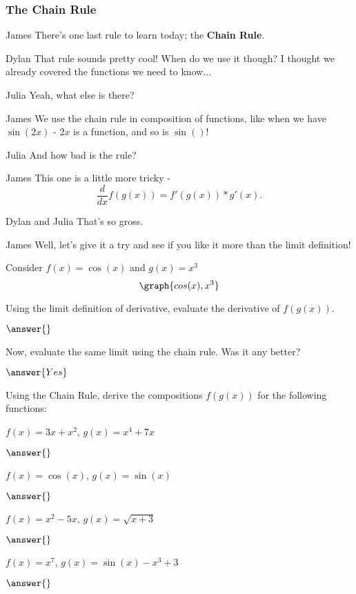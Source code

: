 \documentclass{ximera}
\begin{document}
\subsubsection{The Chain Rule}
\begin{dialogue}
\item[James] There's one last rule to learn today; the \textbf{Chain Rule}.
\item[Dylan] That rule sounds pretty cool! When do we use it though? I thought we already covered the functions we need to know...
\item[Julia] Yeah, what else is there?
\item[James] We use the chain rule in composition of functions, like when we have $\sin(2x)$ - $2x$ is a function, and so is $\sin()$!
\item[Julia] And how bad is the rule?
\item[James] This one is a little more tricky - $$\frac{d}{dx}f(g(x)) = f'(g(x))*g'(x)\text{.}$$
\item[Dylan and Julia] That's so gross.
\item[James] Well, let's give it a try and see if you like it more than the limit definition!
\end{dialogue}
\begin{question}
Consider $f(x) = \cos(x)$ and $g(x) = x^3$
\[
\graph{cos(x), x^3}
\]

Using the limit definition of derivative, evaluate the derivative of $f(g(x))$.

$\answer{}$

Now, evaluate the same limit using the chain rule. Was it any better?

$\answer{Yes}$
\end{question}
\begin{question}

Using the Chain Rule, derive the compositions $f(g(x))$ for the following functions:

$f(x) = 3x+x^2$, $g(x) = x^4+7x$

$\answer{}$

$f(x) = \cos(x)$, $g(x) = \sin(x)$

$\answer{}$

$f(x) = x^2-5x$, $g(x) = \sqrt{x+3}$

$\answer{}$

$f(x) = x^7$, $g(x) = \sin(x)-x^3+3$

$\answer{}$
\end{question}
\end{document}
